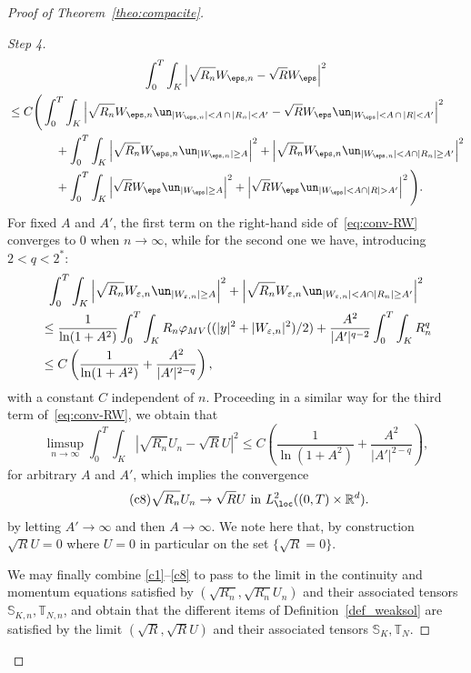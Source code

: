 \begin{proof}[Proof of Theorem~\ref{theo:compacite}]
\begin{proof}[Step 4]
\begin{multline}
\int_{0}^T \int_K \left|\sqrt{R_n} W_{\eps,n} - \sqrt{R} W_{\eps} \right|^2 \\
\begin{aligned}
& \le C \Bigg (
\int_{0}^T \int_K \left|\sqrt{R_n} W_{\eps,n} \un_{|W_{\eps,n}| < A \, \cap \, |R_n| < A'} - \sqrt{R} W_{\eps} \un_{|W_{\eps}| < A \, \cap \, |R| < A'} \right|^2 \\
&\qquad \qquad + \int_{0}^T \int_K \left|\sqrt{R_n} W_{\eps,n} \un_{|W_{\eps,n}| \ge A}\right|^2 + \left|\sqrt{R_n} W_{\eps,n} \un_{|W_{\eps,n}| < A \cap |R_n |\ge A' }\right|^2 \\
&\qquad\qquad + \int_{0}^T \int_K \left|\sqrt{R} W_{\eps} \un_{|W_{\eps}| \ge A}\right|^2 + \left|\sqrt{R} W_{\eps} \un_{|W_{\eps}| < A \cap |R| > A' }\right|^2
\Bigg).
\end{aligned}
\end{multline}
For fixed $A$ and $A'$, the first term on the right-hand side of~\eqref{eq:conv-RW} converges to $0$ when $n\to \infty$, while for the second one we have, introducing $2 < q < 2^{*}$:
\begin{multline*}
\int_{0}^T \int_K \left|\sqrt{R_n} W_{\varepsilon,n} \un_{|W_{\varepsilon,n}| \ge A}\right|^2 + \left|\sqrt{R_n} W_{\varepsilon,n} \un_{|W_{\varepsilon,n}| < A \cap |R_n| \ge A' }\right|^2\\
\begin{aligned}
&\le \dfrac{1}{\ln(1+A^2)} \int_{0}^T \int_K R_n \varphi_{MV}((|y|^2 + |W_{\varepsilon,n}|^2)/2) + \dfrac{A^2}{|A'|^{q-2}}\int_{0}^T \int_K R_n^{q} \\
&\le C \left(\dfrac{1}{\ln(1+A^2)} + \dfrac{A^2}{|A'|^{2-q}} \right),
\end{aligned}
\end{multline*}
with a constant $C$ independent of $n.$ Proceeding in a similar way for the third term of~\eqref{eq:conv-RW}, we obtain that
\[
\limsup_{n \to \infty} \int_{0}^T \int_K \left|\sqrt{R_n} U_n - \sqrt{R} U \right|^2
\le C \left(\dfrac{1}{\ln(1+A^2)} + \dfrac{A^2}{|A'|^{2-q}} \right),
\]
for arbitrary $A$ and $A'$, which implies the convergence
\begin{equation}\label{c8}
\tag{c8}
\sqrt{R_n} U_n \to \sqrt{R}U \text{ in $L^2_{\loc}((0,T) \times \mathbb R^d)$}.
\end{equation}
by letting $A' \to \infty$ and then $A \to \infty.$ We note here that, by construction $\sqrt{R} U = 0$ where $U =0$ in particular on the set $\{\sqrt{R}=0\}.$

We may finally combine \eqref{c1}--\eqref{c8} to pass to the limit in the continuity and momentum equations satisfied by $(\sqrt{R_n},\sqrt{R_n}U_n)$ and their associated tensors $\mathbb S_{K,n}, \mathbb T_{N,n}$, and obtain that the different items of Definition~\ref{def_weaksol} are satisfied by the limit $(\sqrt{R},\sqrt{R}U)$ and their associated tensors $\mathbb S_{K}, \mathbb T_{N}$.
\end{proof}
\let\qed\relax
\end{proof}

